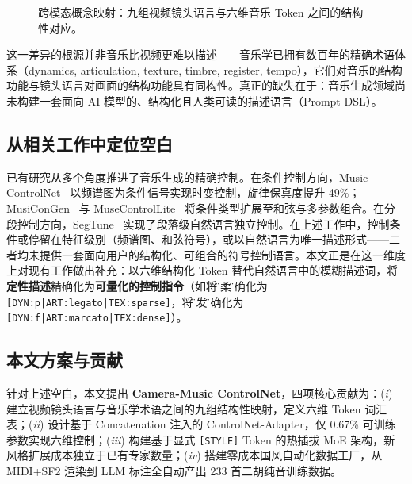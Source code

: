 \documentclass[11pt]{article}
\begin{document}
\begin{figure}[h]
{
}
\caption{跨模态概念映射：九组视频镜头语言与六维音乐 Token 之间的结构性对应。}
\label{fig:cross_modal_mapping}
\end{figure}

这一差异的根源并非音乐比视频更难以描述——音乐学已拥有数百年的精确术语体系（dynamics, articulation, texture, timbre, register, tempo），它们对音乐的结构功能与镜头语言对画面的结构功能具有同构性。真正的缺失在于：音乐生成领域尚未构建一套面向 AI 模型的、结构化且人类可读的描述语言（Prompt DSL）。

\subsection{从相关工作中定位空白}

已有研究从多个角度推进了音乐生成的精确控制。在条件控制方向，Music ControlNet~\cite{musiccontrolnet} 以频谱图为条件信号实现时变控制，旋律保真度提升 49\%；MusiConGen~\cite{musecong} 与 MuseControlLite~\cite{muselite} 将条件类型扩展至和弦与多参数组合。在分段控制方向，SegTune~\cite{segtune} 实现了段落级自然语言独立控制。在上述工作中，控制条件或停留在特征级别（频谱图、和弦符号），或以自然语言为唯一描述形式——二者均未提供一套面向用户的结构化、可组合的符号控制语言。本文正是在这一维度上对现有工作做出补充：以六维结构化 Token 替代自然语言中的模糊描述词，将\textbf{定性描述}精确化为\textbf{可量化的控制指令}（如将\"轻柔\"精确化为 \texttt{[DYN:p|ART:legato|TEX:sparse]}，将\"爆发\"精确化为 \texttt{[DYN:f|ART:marcato|TEX:dense]}）。

\subsection{本文方案与贡献}

针对上述空白，本文提出 \textbf{Camera-Music ControlNet}，四项核心贡献为：(\textit{i}) 建立视频镜头语言与音乐学术语之间的九组结构性映射，定义六维 Token 词汇表；(\textit{ii}) 设计基于 Concatenation 注入的 ControlNet-Adapter，仅 0.67\% 可训练参数实现六维控制；(\textit{iii}) 构建基于显式 \texttt{[STYLE]} Token 的热插拔 MoE 架构，新风格扩展成本独立于已有专家数量；(\textit{iv}) 搭建零成本国风自动化数据工厂，从 MIDI+SF2 渲染到 LLM 标注全自动产出 233 首二胡纯音训练数据。
\end{document}
